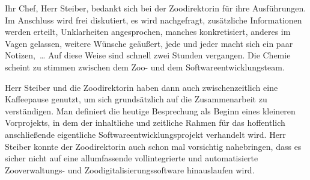 \cleardoublepage
\FallBeispielZoo
\label{sec:Lektion-2-Zoo}



Ihr Chef, Herr Steiber, bedankt sich bei der Zoodirektorin für ihre Ausführungen. Im Anschluss wird frei diskutiert, es wird nachgefragt, zusätzliche Informationen werden erteilt, Unklarheiten angesprochen, manches konkretisiert, anderes im Vagen gelassen, weitere Wünsche geäußert, jede und jeder macht sich ein paar Notizen,~\ldots 
\linebreak
Auf diese Weise sind schnell zwei Stunden vergangen. Die Chemie scheint zu stimmen zwischen dem Zoo- und dem Softwareentwicklungsteam.

Herr Steiber und die Zoodirektorin haben dann auch zwischenzeitlich eine Kaffeepause genutzt, um sich grundsätzlich auf die Zusammenarbeit zu verständigen. Man definiert die heutige Besprechung als Beginn eines kleineren Vorprojekts, in dem der inhaltliche und zeitliche Rahmen für das hoffentlich anschließende eigentliche Softwareentwicklungsprojekt verhandelt wird. Herr Steiber konnte der Zoo\-direk\-torin auch schon mal vorsichtig nahebringen, dass es sicher nicht auf eine allumfassende vollintegrierte und automatisierte Zooverwaltungs- und Zoodigitalisierungssoftware hinauslaufen wird.

